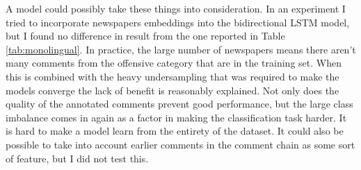 \documentclass[nofilelist]{cslthse-msc}
\begin{document}
A model could possibly take these things into consideration. In an experiment I tried to incorporate newspapers embeddings into the bidirectional LSTM model, but I found no difference in result from the one reported in Table \ref{tab:monolingual}. In practice, the large number of newspapers means there aren't many comments from the offensive category that are in the training set. When this is combined with the heavy undersampling that was required to make the models converge the lack of benefit is reasonably explained. Not only does the quality of the annotated comments prevent good performance, but the large class imbalance comes in again as a factor in making the classification task harder. It is hard to make a model learn from the entirety of the dataset.  It could also be possible to take into account earlier comments in the comment chain as some sort of feature, but I did not test this.







{}
\end{document}
